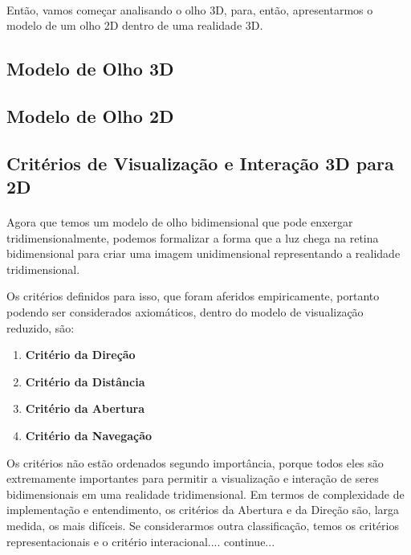 \documentclass{article}
\begin{document}
	\paragraph{}
	Então, vamos começar analisando o olho 3D, para, então, apresentarmos o modelo de um olho 2D dentro de uma realidade 3D.
	
	\subsection{Modelo de Olho 3D} \label{mo3d}
	
	\subsection{Modelo de Olho 2D} \label{mo2d}
	
	\subsection{Critérios de Visualização e Interação 3D para 2D} \label{criterios}
	\paragraph{}
	Agora que temos um modelo de olho bidimensional que pode enxergar tridimensionalmente, podemos formalizar a forma que a luz chega na retina bidimensional para criar uma imagem unidimensional representando a realidade tridimensional.
	
	Os critérios definidos para isso, que foram aferidos empiricamente, portanto podendo ser considerados axiomáticos, dentro do modelo de visualização reduzido, são:
	
	\begin{enumerate}
		\item \textbf{Critério da Direção}
		\item \textbf{Critério da Distância}
		\item \textbf{Critério da Abertura}
		\item \textbf{Critério da Navegação}
	\end{enumerate}
	
	Os critérios não estão ordenados segundo importância, porque todos eles são extremamente importantes para permitir a visualização e interação de seres bidimensionais em uma realidade tridimensional. Em termos de complexidade de implementação e entendimento, os critérios da Abertura e da Direção são, larga medida, os mais difíceis. Se considerarmos outra classificação, temos os critérios representacionais e o critério interacional.... continue...
		
\end{document}
